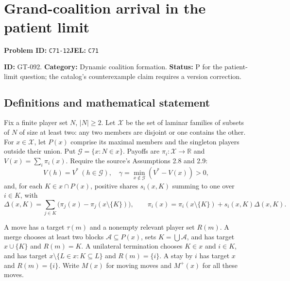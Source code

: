 \documentclass[11pt,a4paper]{article}
\begin{document}
\section*{Grand-coalition arrival in the patient limit}
\textbf{Problem ID:} \texttt{C71-12}\quad \textbf{JEL:} \texttt{C71}\par
\label{problem:OP-0222}
\label{game:GT-092}
{\sffamily\small\color{muted}
\noindent\textbf{ID:} GT-092. \textbf{Category:} Dynamic coalition formation.
\textbf{Status:} P for the patient-limit question; the catalog's counterexample claim requires a version correction.
\par}
\subsection*{Definitions and mathematical statement}
Fix a finite player set $N$, $|N|\geq2$. Let $\mathcal X$ be the set of laminar families of subsets of $N$ of size at least two: any two members are disjoint or one contains the other. For $x\in\mathcal X$, let $P(x)$ comprise its maximal members and the singleton players outside their union. Put
$\mathcal G=\{x:N\in x\}$. Payoffs are $\pi_i:\mathcal X\to\mathbb R$ and $V(x)=\sum_i\pi_i(x)$.
Require the source's Assumptions 2.8 and 2.9:
\[
 V(h)=V^*\ (h\in\mathcal G),\quad
 \gamma=\min_{x\notin\mathcal G}(V^*-V(x))>0,
\]
and, for each $K\in x\cap P(x)$, positive shares $s_i(x,K)$ summing to one over $i\in K$, with
\[
 \Delta(x,K)=\sum_{j\in K}\bigl(\pi_j(x)-\pi_j(x\setminus\{K\})\bigr),\qquad
 \pi_i(x)=\pi_i(x\setminus\{K\})+s_i(x,K)\Delta(x,K).
\]

A move has a target $\tau(m)$ and a nonempty relevant player set $R(m)$. A merge chooses at least two blocks $\mathcal A\subseteq P(x)$, sets $K=\bigcup\mathcal A$, and has target $x\cup\{K\}$ and $R(m)=K$. A unilateral termination chooses $K\in x$ and $i\in K$, and has target
$x\setminus\{L\in x:K\subseteq L\}$ and $R(m)=\{i\}$. A stay by $i$ has target $x$ and $R(m)=\{i\}$. Write $M(x)$ for moving moves and $M^+(x)$ for all these moves.
\end{document}
